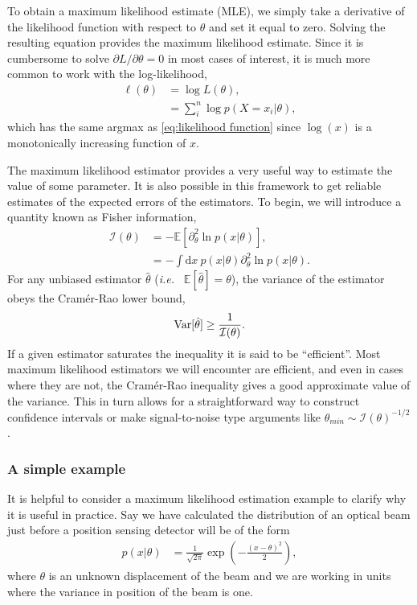 To obtain a maximum likelihood estimate (MLE), we simply take a derivative of the likelihood function with respect to $\theta$ and set it equal to zero.  Solving the resulting equation provides the maximum likelihood estimate.  Since it is cumbersome to solve $\partial L/ \partial \theta = 0$ in most cases of interest, it is much more common to work with the log-likelihood,
\begin{align}
\nonumber  \ell(\theta) &= \log L(\theta), \\
                        &=  \sum^n_i  \log p(X=x_i|\theta),
\end{align}
which has the same argmax as \eqref{eq:likelihood function} since $\log(x)$ is a monotonically increasing function of $x$.

The maximum likelihood estimator provides a very useful way to estimate the value of some parameter.  It is also possible in this framework to get reliable estimates of the expected errors of the estimators.  To begin, we will introduce a quantity known as Fisher information,
\begin{align}
\nonumber  \mathcal{I}(\theta) &= -\mathbb{E}\left[\partial^2_\theta \ln p(x|\theta)\right], \\
                               &= -\int \text{d}x~ p(x|\theta)\partial^2_\theta \ln p(x|\theta).
\end{align}
For any unbiased estimator $\hat{\theta}$ (\emph{i.e.~} $\mathbb{E}[\hat{\theta}] = \theta$), the variance of the estimator obeys the Cram\'{e}r-Rao lower bound,
\begin{align}
  {\rm {Var}}[\hat{\theta}] \ge \frac{1}{\mathcal{I}(\theta)}.
\end{align}
If a given estimator saturates the inequality it is said to be ``efficient''.  Most maximum likelihood estimators we will encounter are efficient, and even in cases where they are not, the Cram\'{e}r-Rao inequality gives a good approximate value of the variance.  This in turn allows for a straightforward way to construct confidence intervals or make signal-to-noise type arguments like $\theta_{min} \sim \mathcal{I}(\theta)^{-1/2}$.

\subsubsection{A simple example}
It is helpful to consider a maximum likelihood estimation example to clarify why it is useful in practice.  Say we have calculated the distribution of an optical beam just before a position sensing detector will be of the form
\begin{align}
  p(x|\theta) &= \frac{1}{\sqrt{2\pi}}\exp\left(-\frac{(x-\theta)^2}{2} \right),
\end{align}
where $\theta$ is an unknown displacement of the beam and we are working in units where the variance in position of the beam is one.

